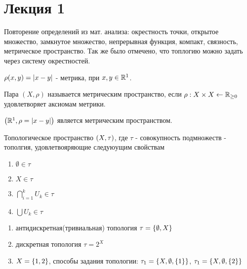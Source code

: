 \section{Лекция 1}

Повторение определений из мат. анализа: окрестность точки, открытое множество, замкнутое  множество, непрерывная функция, компакт, связность, метрическое пространство. Так же было отмечено, что топлогию можно задать через систему окрестностей.

\begin{nota_bene}
    $\rho(x,y) = \left|x - y\right|$ - метрика, при $x,y \in \mathbb{R}^1$.
\end{nota_bene}

\begin{definition}
    Пара $(X, \rho)$ называется метрическим пространство, если $\rho: X \times X \leftarrow \mathbb{R}_{\geq 0}$ удовлетворяет аксиомам метрики. 
\end{definition}

\begin{theorem}
    $\left(\mathbb{R}^1 , \rho = \left|x - y\right|\right)$ является метрическим пространством.
\end{theorem}

\begin{definition}
    Топологическое пространство $\left(X, \tau\right)$, где $\tau$ - совокупность подмножеств - тополгия, удовлетвояряющие следуюущим свойствам
    \begin{enumerate}
        \item $\emptyset \in \tau$
        \item $X \in \tau$
        \item $\bigcap_{i = 1}^{k}U_k \in \tau$
        \item $\bigcup U_k \in \tau$
    \end{enumerate}
\end{definition}

\begin{example}
    \begin{enumerate}
        \item антидискретная(тривиальная) топология $\tau = \left\{\emptyset, X\right\}$
        \item дискретная топология $\tau = 2^X$
        \item $X = \left\{1, 2\right\}$, способы задания топологии: $\tau_1 = \left\{X, \emptyset, \left\{1\right\}\right\}$, $\tau_1 = \left\{X, \emptyset, \left\{2\right\}\right\}$
    \end{enumerate}
\end{example}

